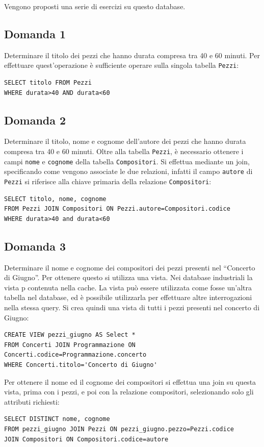 \documentclass{article}
\numberwithin{equation}{subsection}
\begin{document}
Vengono proposti una serie di esercizi su questo database. 

\subsection{Domanda 1}
Determinare il titolo dei pezzi che hanno durata compresa tra 40 e 60 minuti. Per effettuare quest'operazione è sufficiente operare sulla singola tabella \verb|Pezzi|:
\begin{verbatim}
SELECT titolo FROM Pezzi
WHERE durata>40 AND durata<60
\end{verbatim}

\subsection{Domanda 2}
Determinare il titolo, nome e cognome dell'autore dei pezzi che hanno durata compresa tra 40 e 60 minuti. Oltre alla tabella \verb|Pezzi|, è necessario ottenere i campi 
\verb|nome| e \verb|cognome| della tabella \verb|Compositori|. Si effettua mediante un join, specificando come vengono associate le due relazioni, infatti il campo \verb|autore| 
di \verb|Pezzi| si riferisce alla chiave primaria della relazione \verb|Compositori|:
\begin{verbatim}
SELECT titolo, nome, cognome  
FROM Pezzi JOIN Compositori ON Pezzi.autore=Compositori.codice
WHERE durata>40 and durata<60
\end{verbatim}

\subsection{Domanda 3}
Determinare il nome e cognome dei compositori dei pezzi presenti nel ``Concerto di Giugno''. Per ottenere questo si utilizza una vista. Nei database industriali 
la vista p contenuta nella cache. La vista può essere utilizzata come fosse un'altra tabella nel database, ed è possibile utilizzarla per effettuare altre 
interrogazioni nella stessa query. Si crea quindi una vista di tutti i pezzi presenti nel concerto di Giugno:
\begin{verbatim}
CREATE VIEW pezzi_giugno AS Select *
FROM Concerti JOIN Programmazione ON Concerti.codice=Programmazione.concerto
WHERE Concerti.titolo='Concerto di Giugno'
\end{verbatim}
Per ottenere il nome ed il cognome dei compositori si effettua una join su questa vista, prima con i pezzi, e poi con la relazione compositori, selezionando solo gli 
attributi richiesti:
\begin{verbatim}
SELECT DISTINCT nome, cognome
FROM pezzi_giugno JOIN Pezzi ON pezzi_giugno.pezzo=Pezzi.codice
JOIN Compositori ON Compositori.codice=autore
\end{verbatim}
\end{document}
